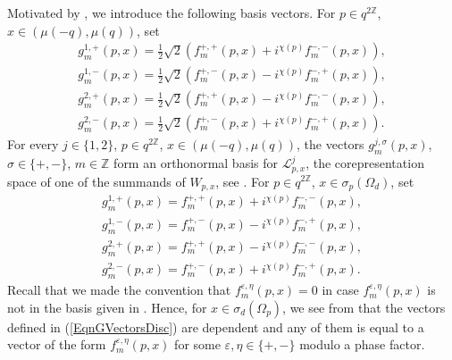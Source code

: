 \documentclass[pdftex]{sigma}
\numberwithin{equation}{section}
\theoremstyle{definition}
\newcommand{\ep}{\varepsilon}
\begin{document}
Motivated by \cite[Lemma 10.11]{GroKoeKus}, we introduce the following basis vectors. For $ p \in q^{2\mathbb{Z}}$, $x \in (\mu(-q),\mu(q))  $, set
\begin{gather*}
g_m^{1,+}(p,x) = \frac{1}{2}\sqrt{2}( f^{+,+}_m(p,x)+i^{\chi(p)}f^{-,-}_m(p,x)) ,\nonumber\\
g_m^{1,-}(p,x) = \frac{1}{2}\sqrt{2}(f^{+,-}_m(p,x)-i^{\chi(p)}f^{-,+}_m(p,x)),\nonumber\\
g_m^{2,+}(p,x) = \frac{1}{2}\sqrt{2}(f^{+,+}_m(p,x)-i^{\chi(p)}f^{-,-}_m(p,x)),\nonumber\\
g_m^{2,-}(p,x) = \frac{1}{2}\sqrt{2}( f^{+,-}_m(p,x)+i^{\chi(p)}f^{-,+}_m(p,x)).%
\end{gather*}
For every $j \in \{1,2\}$, $p \in q^{2\mathbb{Z}}$, $x \in (\mu(-q),\mu(q))$, the vectors $g_m^{j, \sigma}(p,x)$, $\sigma \in \{ +,-\}$, $m \in \mathbb{Z}$ form an orthonormal basis for $\mathcal{L}_{p,x}^j$, the corepresentation space of one of the  summands of $W_{p,x}$, see \cite[equation~(95)]{GroKoeKus}.
For $  p \in q^{2\mathbb{Z}}$, $x \in \sigma_p(\Omega_d) $, set
\begin{gather}
g_m^{1,+}(p,x) =   f^{+,+}_m(p,x)+i^{\chi(p)}f^{-,-}_m(p,x) ,\nonumber\\
g_m^{1,-}(p,x) = f^{+,-}_m(p,x)-i^{\chi(p)}f^{-,+}_m(p,x),\nonumber\\
g_m^{2,+}(p,x) = f^{+,+}_m(p,x)-i^{\chi(p)}f^{-,-}_m(p,x),\nonumber\\
g_m^{2,-}(p,x) = f^{+,-}_m(p,x)+i^{\chi(p)}f^{-,+}_m(p,x).\label{EqnGVectorsDisc}
\end{gather}
Recall that we made the convention that $f^{\ep,\eta}_m(p,x) = 0$ in case $f^{\ep,\eta}_m(p,x)$ is not in the basis given in \cite[Proposition~5.2]{GroKoeKus}. Hence, for $x \in \sigma_d(\Omega_p)$, we see from \cite[Proposition~5.2]{GroKoeKus} that the vectors def\/ined in (\ref{EqnGVectorsDisc}) are dependent and any of them is equal to a vector of the form $f^{\ep, \eta}_m(p,x)$ for some $\ep, \eta \in \{ +,-\}$ modulo a phase factor.
\end{document}
